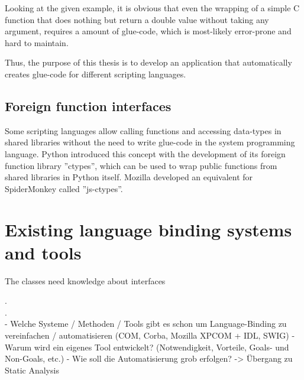 Looking at the given example, it is obvious that even the wrapping of a simple C function that does nothing but return a double value without taking any argument, requires a  amount of glue-code, which is most-likely error-prone and hard to maintain.

Thus, the purpose of this thesis is to develop an application that automatically creates glue-code for different scripting languages.

\subsection{Foreign function interfaces}


Some scripting languages allow calling functions and accessing data-types in shared libraries without the need to write glue-code in the system programming language. Python introduced this concept with the development of its foreign function library ''ctypes'', which can be used to wrap public functions from shared libraries in Python itself. Mozilla developed an equivalent for SpiderMonkey called ''js-ctypes''.

\section{Existing language binding systems and tools}

The classes need knowledge about interfaces

.\\
.\\
  - Welche Systeme / Methoden / Tools gibt es schon um Language-Binding zu vereinfachen / automatisieren (COM, Corba, Mozilla XPCOM + IDL, SWIG)
  - Warum wird ein eigenes Tool entwickelt? (Notwendigkeit, Vorteile, Goals- und Non-Goals, etc.)
  - Wie soll die Automatisierung grob erfolgen? -> Übergang zu Static Analysis